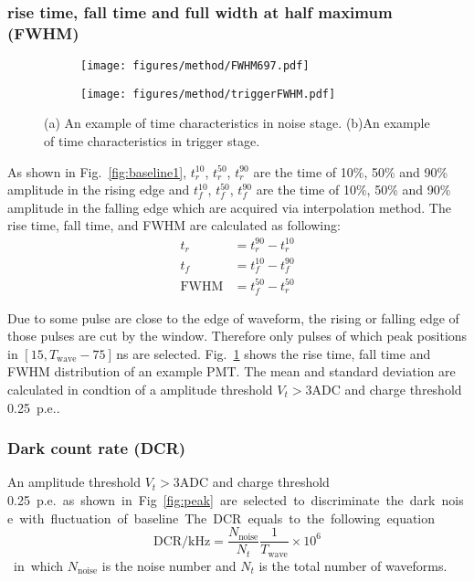\subsubsection{rise time, fall time and full width at half maximum (FWHM)}
\begin{figure}[!htbp]
    \centering
    \begin{subfigure}[t]{0.49\textwidth}
        \texttt{[image: figures/method/FWHM697.pdf]}
        \caption{}
        \label{fig:risefallFWHM}
    \end{subfigure}
    \begin{subfigure}[t]{0.49\textwidth}
        \texttt{[image: figures/method/triggerFWHM.pdf]}
        \caption{}
        \label{fig:triggerFWHM}
    \end{subfigure}
    \caption{(a) An example of time characteristics in noise stage. (b)An example of time characteristics in trigger stage.}
\end{figure}
As shown in Fig.~\ref{fig:baseline1}, $t^{10}_r$, $t^{50}_r$, $t^{90}_r$ are the time of 10\%, 50\% and 90\% amplitude in the rising edge and $t^{10}_f$, $t^{50}_f$, $t^{90}_f$ are the time of 10\%, 50\% and 90\% amplitude in the falling edge which are acquired via interpolation method. The rise time, fall time, and FWHM are calculated as following:
\begin{align}
    t_r &= t^{90}_r - t^{10}_r\\
    t_f &= t^{10}_f - t^{90}_f\\
    \mathrm{FWHM} &= t^{50}_f - t^{50}_r
\end{align}

Due to some pulse are close to the edge of waveform, the rising or falling edge of those pulses are cut by the window. Therefore only pulses of which peak positions in $[15, T_{\mathrm{wave}}-75]$\,ns are selected. Fig.~\ref{fig:risefallFWHM} shows the rise time, fall time and FWHM distribution of an example PMT. The mean and standard deviation are calculated in condtion of a amplitude threshold $V_{t}>3\mathrm{ADC}$ and charge threshold \SI{0.25}{p.e.}.

\subsubsection{Dark count rate (DCR)}
An amplitude threshold $V_{t}>3\mathrm{ADC}$ and charge threshold \SI{0.25}{p.e.} as shown in Fig.~\ref{fig:peak} are selected to discriminate the dark noise with fluctuation of baseline. The DCR equals to the following equation
\begin{equation}
    \mathrm{DCR/kHz} = \frac{N_{\mathrm{noise}}}{N_{t}}\frac{1}{T_{\mathrm{wave}}}\times 10^{6}
\end{equation}
in which $N_{\mathrm{noise}}$ is the noise number and $N_{t}$ is the total number of waveforms.


